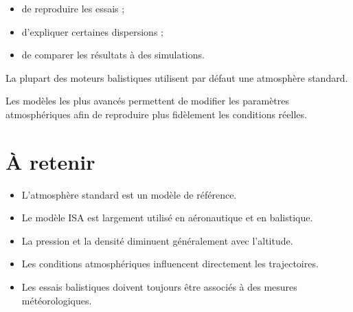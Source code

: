 \begin{itemize}
\item de reproduire les essais ;
\item d'expliquer certaines dispersions ;
\item de comparer les résultats à des simulations.
\end{itemize}

\begin{simulation}

La plupart des moteurs balistiques utilisent par défaut une atmosphère
standard.

Les modèles les plus avancés permettent de modifier les paramètres
atmosphériques afin de reproduire plus fidèlement les conditions réelles.

\end{simulation}

\section{À retenir}

\begin{aretenir}

\begin{itemize}
\item L'atmosphère standard est un modèle de référence.
\item Le modèle ISA est largement utilisé en aéronautique et en balistique.
\item La pression et la densité diminuent généralement avec l'altitude.
\item Les conditions atmosphériques influencent directement les trajectoires.
\item Les essais balistiques doivent toujours être associés à des mesures météorologiques.
\end{itemize}

\end{aretenir}

